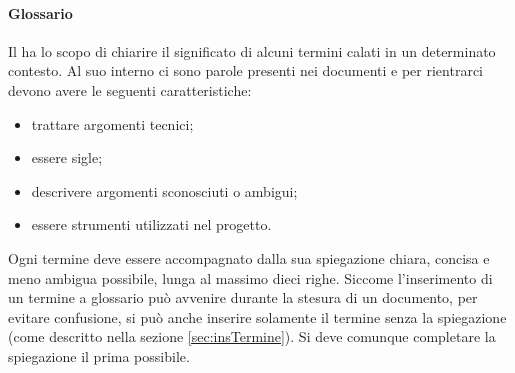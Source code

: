             \paragraph{Glossario} \label{sec:normeGlossario}
            Il \gl{} ha lo scopo di chiarire il significato di alcuni termini calati in un determinato contesto. Al suo interno ci sono parole presenti nei documenti e per rientrarci devono avere le seguenti caratteristiche:
            \begin{itemize}
            	\item trattare argomenti tecnici;
            	\item essere sigle;
            	\item descrivere argomenti sconosciuti o ambigui;
            	\item essere strumenti utilizzati nel progetto.
            \end{itemize} 
	        Ogni termine deve essere accompagnato dalla sua spiegazione chiara, concisa e meno ambigua possibile, lunga al massimo dieci righe. Siccome l'inserimento di un termine a glossario può avvenire durante la stesura di un documento, per evitare confusione, si può anche inserire solamente il termine senza la spiegazione (come descritto nella sezione \ref{sec:insTermine}). Si deve comunque completare la spiegazione il prima possibile.
